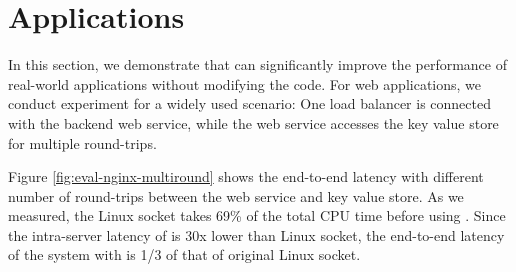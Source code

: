 \section{Applications}
\label{sec:application}

In this section, we demonstrate that \sys{} can significantly improve the performance of real-world applications without modifying the code.
For web applications, we conduct experiment for a widely used scenario: One load balancer is connected with the backend web service, while the web service accesses the key value store for multiple round-trips.

Figure \ref{fig:eval-nginx-multiround} shows the end-to-end latency with different number of round-trips between the web service and key value store. As we measured, the Linux socket takes 69\% of the total CPU time before using \libipc. Since the intra-server latency of \sys{} is 30x lower than Linux socket, the end-to-end latency of the system with \sys{}  is 1/3 of that of original Linux socket.












